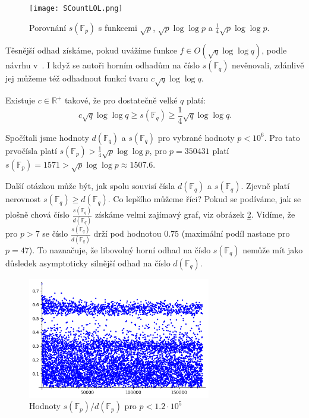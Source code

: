 \documentclass[12pt]{report}
\begin{document}
\begin{figure}[h]
\centering
  \texttt{[image: SCountLOL.png]}
  \label{fig:boat2}
\caption{Porovnání $s(\mathbb{F}_p)$ s funkcemi $\sqrt{p}$, $\sqrt{p} \log \log p$ a $\frac{1}{4} \sqrt{p} \log \log p$.}
\end{figure}

Těsnější odhad získáme, pokud uvážíme funkce $f \in O(\sqrt{q} \log \log q)$, podle návrhu v~\cite{Meduza}. I když se autoři horním odhadům na číslo $s(\mathbb{F}_q)$ nevěnovali, zdánlivě jej můžeme též odhadnout funkcí tvaru $c \sqrt{q} \log \log q$.
\begin{domnenka}\label{dd}
Existuje $c \in \mathbb{R}^{+}$ takové, že pro dostatečně velké $q$ platí:
$$c \sqrt{q} \log \log q \geqslant s(\mathbb{F}_q) \geqslant \frac{1}{4} \sqrt{q} \log \log q.$$
\end{domnenka}

Spočítali jsme hodnoty $d(\mathbb{F}_q)$ a $s(\mathbb{F}_q)$ pro vybrané hodnoty $p < 10^6$. Pro tato prvočísla platí $s(\mathbb{F}_p) > \frac{1}{4} \sqrt{p} \log \log p$, pro $p=350431$ platí $s(\mathbb{F}_p) = 1571 > \sqrt{p} \log \log p \approx 1507.6$.

Další otázkou může být, jak spolu souvisí čísla $d(\mathbb{F}_q)$ a $s(\mathbb{F}_q)$. Zjevně platí nerovnost $s(\mathbb{F}_q) \geqslant d(\mathbb{F}_q)$. Co lepšího můžeme říci? Pokud se podíváme, jak se plošně chová číslo $\frac{s(\mathbb{F}_q)}{d(\mathbb{F}_q)}$ získáme velmi zajímavý graf, viz obrázek \ref{figg}. Vidíme, že pro $p>7$ se číslo $\frac{s(\mathbb{F}_q)}{d(\mathbb{F}_q)}$ drží pod hodnotou $0.75$ (maximální podíl nastane pro $p=47$). To naznačuje, že libovolný horní odhad na číslo $s(\mathbb{F}_q)$ nemůže mít jako důsledek asymptoticky silnější odhad na číslo $d(\mathbb{F}_q)$.  



\begin{figure}[h]
\centering
  \includegraphics[width=8cm]{Podil.png}

  \caption{Hodnoty $s(\mathbb{F}_p)/d(\mathbb{F}_p)$ pro $p < 1.2 \cdot 10^5$}
  \label{figg}
\end{figure}
\end{document}
